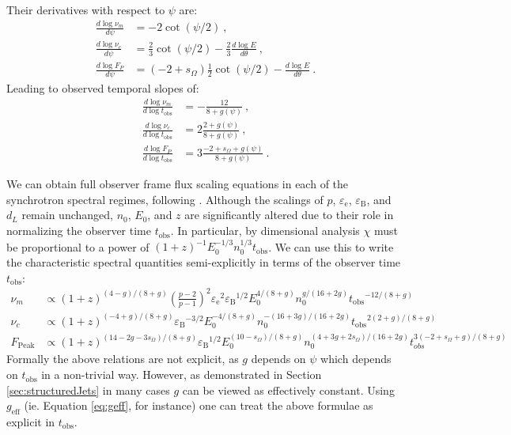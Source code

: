 \documentclass[twocolumn]{aastex62}
\newcommand{\tobs}{\ensuremath{t_{\mathrm{obs}}}}
\newcommand{\epse}{\ensuremath{\varepsilon_{\mathrm{e}}}}
\newcommand{\epsB}{\ensuremath{\varepsilon_{\mathrm{B}}}}
\newcommand{\geff}{\ensuremath{g_{\mathrm{eff}}}}
\newcommand{\som}{\ensuremath{s_{\Omega}}}
\begin{document}
Their derivatives with respect to $\psi$ are:
\begin{align}
	\frac{d \log \nu_m}{d\psi} &= -2 \cot(\psi/2)\ , \\
	\frac{d \log \nu_c}{d\psi} &= \frac{2}{3} \cot(\psi/2) - \frac{2}{3} \frac{d \log E}{d \theta}\ , \\
	\frac{d \log F_P}{d\psi} &= \left(-2 + \som\right)\frac{1}{2} \cot(\psi/2) -  \frac{d \log E}{d \theta}\ .
\end{align}
Leading to observed temporal slopes of:
\begin{align}
	\frac{d \log \nu_m}{d\log \tobs} &= -\frac{12}{8+g(\psi)}\ , \\
	\frac{d \log \nu_c}{d\log\tobs} &= 2\frac{2 + g(\psi)}{8+g(\psi)}\ , \\
	\frac{d \log F_P}{d\log \tobs} &= 3\frac{-2 + \som +  g(\psi)}{8+g(\psi)}\ .
\end{align}

We can obtain full observer frame flux scaling equations in each of the synchrotron spectral regimes, following \citet{van-Eerten:2012ac}. Although the scalings of $p$, $\epse$, $\epsB$, and $d_L$ remain unchanged, $n_0$, $E_0$, and $z$ are significantly altered due to their role in normalizing the observer time $\tobs$. In particular, by dimensional analysis $\chi$ must be proportional to a power of $(1+z)^{-1} E_0^{-1/3} n_0^{1/3} \tobs$.  We can use this to write the characteristic spectral quantities semi-explicitly in terms of the observer time $\tobs$:
\begin{align}
	\nu_m & \propto  (1+z)^{(4-g)/(8+g)}  \left(\frac{p-2}{p-1}\right)^2  \epse^2 \epsB^{1/2}E_0^{4/(8+g)} n_0^{g/(16+2g)} \tobs^{-12/(8+g)} \\
	\nu_c & \propto  (1+z)^{(-4+g)/(8+g)} \epsB^{-3/2}   E_0^{-4/(8+g)} n_0^{-(16+3g)/(16+2g)} \tobs^{2(2+g)/(8+g)} \\
	F_{\mathrm{Peak}} &\propto  (1+z)^{(14-2g-3\som)/(8+g)}  \epsB^{1/2} E_0^{(10-\som)/(8+g)} n_0^{(4+3g+2\som)/(16+2g)} t_{obs}^{3(-2+\som+g)/(8+g)}
\end{align}
Formally the above relations are not explicit, as $g$ depends on $\psi$ which depends on $\tobs$ in a non-trivial way.  However, as demonstrated in Section \ref{sec:structuredJets} in many cases $g$ can be viewed as effectively constant.  Using $\geff$ (ie. Equation \eqref{eq:geff}, for instance) one can treat the above formulae as explicit in $\tobs$.
\end{document}
